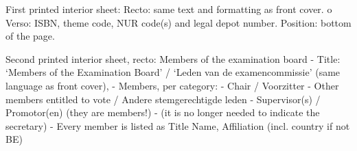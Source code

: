 \documentclass[
  11pt, %
  oneside, %
  english, %
  singlespacing, %
  liststotoc, %
  headsepline, %
  chapterinoneline, %
]{MastersDoctoralThesis} %
\begin{document}
\frontmatter %

\pagestyle{plain} %

\sloppy




\cleardoublepage

First printed interior sheet:
 Recto: same text and formatting as front cover.
o Verso: ISBN, theme code, NUR code(s) and legal depot number. Position: bottom of the page.

\clearpage

Second printed interior sheet, recto: Members of the examination board
- Title: ‘Members of the Examination Board’ / ‘Leden van de examencommissie’ (same
language as front cover),
- Members, per category:
- Chair / Voorzitter
- Other members entitled to vote / Andere stemgerechtigde leden
- Supervisor(s) / Promotor(en) (they are members!)
- (it is no longer needed to indicate the secretary)
- Every member is listed as Title Name, Affiliation (incl. country if not BE)

\clearpage

% 







{\hypersetup{linkcolor=black} %
  \tableofcontents %
  \listoffigures %
  \listoftables %
}


  
\end{document}

